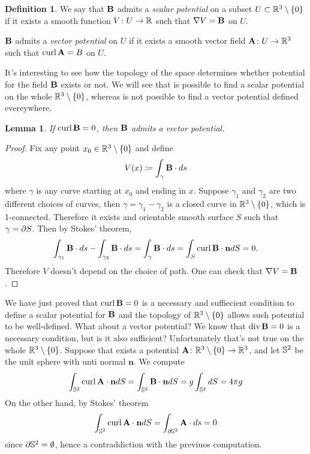 \documentclass{article}
\newtheorem{lemma}{Lemma}
\theoremstyle{definition}
\newtheorem{defi}{Definition}
\theoremstyle{remark}
\begin{document}
\begin{defi}
We say that \(\mathbf{B}\) admits a \emph{scalar potential} on a subset \(U\subset\mathbb{R}^3\setminus\{0\}\) if it exists a smooth function \(V\colon  U\to\mathbb{R}\) such that \(\nabla V=\mathbf{B}\) on \(U\).

\(\mathbf{B}\) admits a \emph{vector potential} on \(U\) if it exists a smooth vector field \(\mathbf{A}\colon U\to\mathbb{R}^3\) such that \(\operatorname{curl}\mathbf{A}=B\) on \(U\).
\end{defi}

It's interesting to see how the topology of the space determines whether potential for the field \(\mathbf{B}\) exists or not. We will see that is possible to find a scalar potential on the whole \(\mathbb{R}^3\setminus\{0\}\), whereas is not possible to find a vector potential defined evereywhere.

\begin{lemma}
    If \(\operatorname{curl}\mathbf{B}=0\), then \(\mathbf{B}\) admits a vector potential.
\end{lemma}

\begin{proof}
    Fix any point \(x_0\in\mathbb{R}^3\setminus\{0\}\) and define 
    \begin{equation}
        V(x)\coloneq \int_{\gamma}\mathbf{B}\cdot ds
    \end{equation}
    where \(\gamma\) is any curve starting at \(x_0\) and ending in \(x\).
    Suppose \(\gamma_1\) and \(\gamma_2\) are two different choices of curves, then \(\gamma=\gamma_1 -\gamma_2\) is a closed curve in \(\mathbb{R}^3\setminus\{0\}\), which is 1-connected. Therefore it exists and orientable smooth surface \(S\) such that \(\gamma=\partial S\).  Then by Stokes' theorem,
    \[\int_{\gamma_1}\mathbf{B}\cdot ds - \int_{\gamma_2}\mathbf{B}\cdot ds = \int_{\gamma}\mathbf{B}\cdot ds = \int_{S}\operatorname{curl}\mathbf{B}\cdot \mathbf{n} dS =0.\]
    Therefore \(V\) doesn't depend on the choice of path. One can check that \(\nabla V=\mathbf{B}\).
\end{proof}

We have just proved that \(\operatorname{curl}\mathbf{B} =0\) is a necessary and suffiecient condition to define a scalar potential for \(\mathbf{B}\) and the topology of \(\mathbb{R}^3\setminus\{0\}\) allows such potential to be well-defined. What about a vector potential? We know that \(\operatorname{div}\mathbf{B}=0\) is a necessary condition, but is it also sufficient? Unfortunately that's not true on the whole \(\mathbb{R}^3\setminus\{0\}\). Suppose that exists a potential \(\mathbf{A}\colon \mathbb{R}^3\setminus\{0\}\to\mathbb{R}^3\), and let \(\mathbb{S}^2\) be the unit sphere with unti normal \(\mathbf{n}\). We compute 
\[ \int_{\mathbb{S}^2}\operatorname{curl}\mathbf{A}\cdot \mathbf{n} dS = \int_{\mathbb{S}^2}\mathbf{B}\cdot \mathbf{n} dS= g \int_{\mathbb{S}^2} dS = 4\pi g \]
On the other hand, by Stokes' theorem
\[ \int_{\mathbb{S}^2}\operatorname{curl}\mathbf{A}\cdot\mathbf{n} dS = \int_{\partial\mathbb{S}^2}\mathbf{A}\cdot ds =0 \]
since \(\partial\mathbb{S}^2=\emptyset\), hence a contraddiction with the previuos computation.
\end{document}
